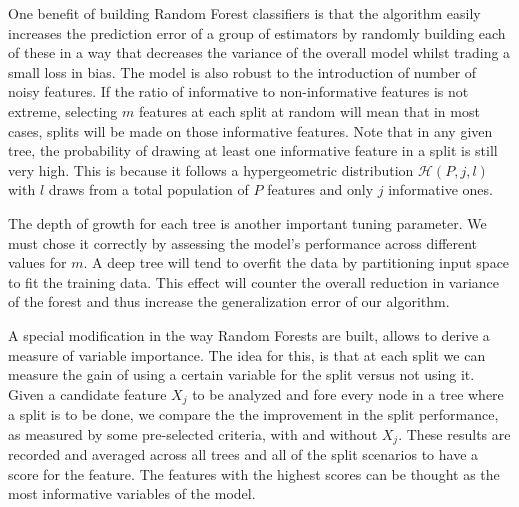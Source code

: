 \documentclass{article}%
\theoremstyle{definition}
\begin{document}
One benefit of building Random Forest classifiers is that the algorithm easily increases the prediction error of a group of estimators by randomly building each of these in a way that decreases the variance of the overall model whilst trading a small loss in bias. The model is also robust to the introduction of number of noisy features. If the ratio of informative to non-informative features is not extreme, selecting $m$ features at each split at random will mean that in most cases, splits will be made on those informative features. Note that in any given tree, the probability of drawing at least one informative feature in a split is still very high. This is because it follows a hypergeometric distribution $\mathcal{H}(P,j,l)$ with $l$ draws from a total population of $P$ features and only $j$ informative ones.

The depth of growth for each tree is another important tuning parameter. We must chose it correctly by assessing the model's performance across different values for $m$.  A deep tree will tend to overfit the data by partitioning input space to fit the training data. This effect will counter the overall reduction in variance of the forest and thus increase the generalization error of our algorithm.


A special modification in the way Random Forests are built, allows to derive a measure of variable importance. The idea for this, is that at each split we can measure the gain of using a certain variable for the split versus not using it. Given a candidate feature $X_j$ to be analyzed and fore every node in a tree where a split is to be done, we compare the the improvement in the split performance, as measured by some pre-selected criteria, with and without $X_j$. These results are recorded and averaged across all trees and all of the split scenarios to have a score for the feature. The features with the highest scores can be thought as the most informative variables of the model.  
\end{document}
